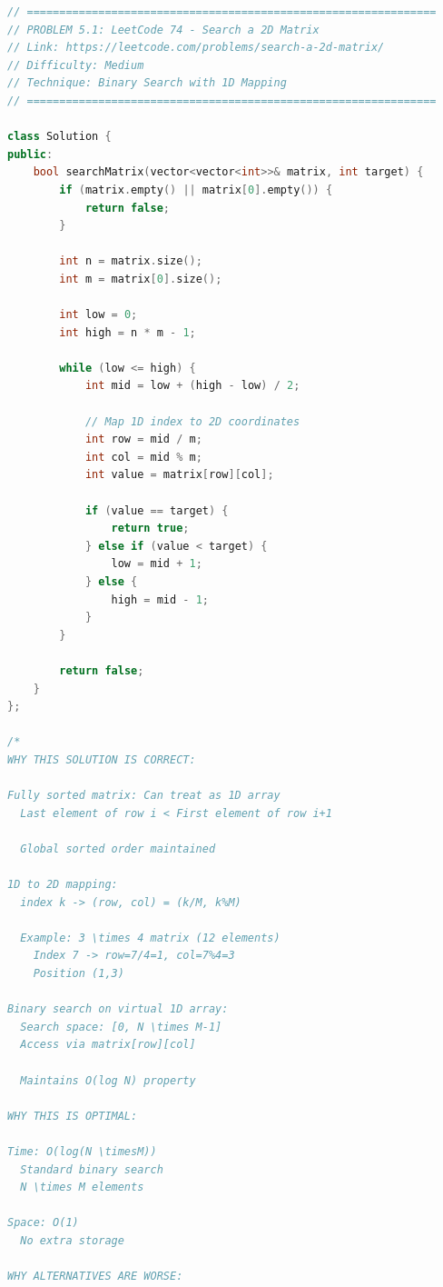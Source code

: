 \documentclass[11pt,a4paper,oneside]{book}
\begin{document}
\begin{lstlisting}[language=C++, caption=Complete Matrix Search Solutions]
// ===============================================================
// PROBLEM 5.1: LeetCode 74 - Search a 2D Matrix
// Link: https://leetcode.com/problems/search-a-2d-matrix/
// Difficulty: Medium
// Technique: Binary Search with 1D Mapping
// ===============================================================

class Solution {
public:
    bool searchMatrix(vector<vector<int>>& matrix, int target) {
        if (matrix.empty() || matrix[0].empty()) {
            return false;
        }
        
        int n = matrix.size();
        int m = matrix[0].size();
        
        int low = 0;
        int high = n * m - 1;
        
        while (low <= high) {
            int mid = low + (high - low) / 2;
            
            // Map 1D index to 2D coordinates
            int row = mid / m;
            int col = mid % m;
            int value = matrix[row][col];
            
            if (value == target) {
                return true;
            } else if (value < target) {
                low = mid + 1;
            } else {
                high = mid - 1;
            }
        }
        
        return false;
    }
};

/*
WHY THIS SOLUTION IS CORRECT:

Fully sorted matrix: Can treat as 1D array
  Last element of row i < First element of row i+1
  
  Global sorted order maintained

1D to 2D mapping:
  index k -> (row, col) = (k/M, k%M)
  
  Example: 3 \times 4 matrix (12 elements)
    Index 7 -> row=7/4=1, col=7%4=3
    Position (1,3) 

Binary search on virtual 1D array:
  Search space: [0, N \times M-1]
  Access via matrix[row][col]
  
  Maintains O(log N) property

WHY THIS IS OPTIMAL:

Time: O(log(N \timesM))
  Standard binary search
  N \times M elements

Space: O(1)
  No extra storage

WHY ALTERNATIVES ARE WORSE:


\end{lstlisting}
\end{document}
